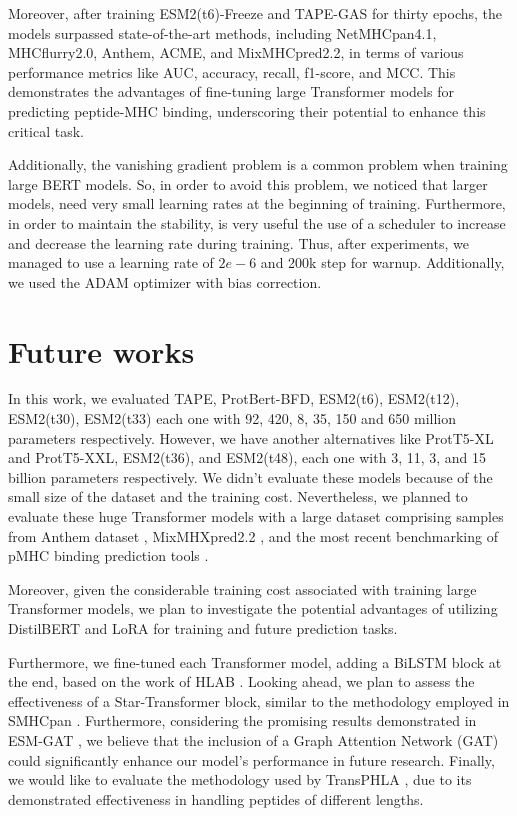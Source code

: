 Moreover, after training ESM2(t6)-Freeze and TAPE-GAS for thirty epochs, the models surpassed state-of-the-art methods, including NetMHCpan4.1, MHCflurry2.0, Anthem, ACME, and MixMHCpred2.2, in terms of various performance metrics like AUC, accuracy, recall, f1-score, and MCC. This demonstrates the advantages of fine-tuning large Transformer models for predicting peptide-MHC binding, underscoring their potential to enhance this critical task.

Additionally, the vanishing gradient problem is a common problem when training large BERT models. So, in order to avoid this problem, we noticed that larger models, need very small learning rates at the beginning of training. Furthermore, in order to maintain the stability, is very useful the use of a scheduler to increase and decrease the learning rate during training. Thus, after experiments, we managed to use a learning rate of $2e-6$ and 200k step for warnup. Additionally, we used the ADAM optimizer with bias correction.

\section{Future works}
In this work, we evaluated TAPE, ProtBert-BFD, ESM2(t6), ESM2(t12), ESM2(t30), ESM2(t33) each one with 92, 420, 8, 35, 150 and 650 million parameters respectively. However, we have another alternatives like ProtT5-XL and ProtT5-XXL, ESM2(t36), and ESM2(t48), each one with 3, 11, 3, and 15 billion parameters respectively. We didn't evaluate these models because of the small size of the dataset and the training cost. Nevertheless, we planned to evaluate these huge Transformer models with a large dataset comprising samples from Anthem dataset \cite{mei2021anthem}, MixMHXpred2.2  \cite{gfeller2023improved}, and the most recent benchmarking of pMHC binding prediction tools \cite{wang2023comprehensive}.

Moreover, given the considerable training cost associated with training large Transformer models, we plan to investigate the potential advantages of utilizing DistilBERT \cite{sanh2019distilbert} and LoRA \cite{hu2021lora} for training and future prediction tasks.

Furthermore, we fine-tuned each Transformer model, adding a BiLSTM block at the end, based on the work of HLAB \cite{zhang2022hlab}. Looking ahead, we plan to assess the effectiveness of a Star-Transformer block, similar to the methodology employed in SMHCpan \cite{ye2023stmhcpan}. Furthermore, considering the promising results demonstrated in ESM-GAT \cite{hashemi2023improved}, we believe that the inclusion of a Graph Attention Network (GAT) could significantly enhance our model's performance in future research. Finally, we would like to evaluate the methodology used by TransPHLA \cite{chu2022transformer}, due to its demonstrated effectiveness in handling peptides of different lengths.